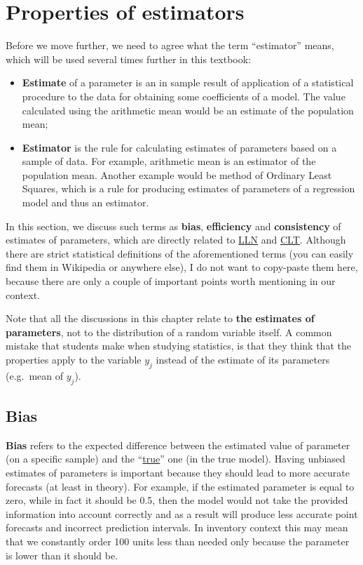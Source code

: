 \documentclass[
]{book}
\providecommand{\tightlist}{%
  \setlength{\itemsep}{0pt}\setlength{\parskip}{0pt}}
\theoremstyle{definition}
\theoremstyle{definition}
\theoremstyle{definition}
\theoremstyle{definition}
\theoremstyle{remark}
\begin{document}
\hypertarget{estimatesProperties}{%
\section{Properties of estimators}\label{estimatesProperties}}

Before we move further, we need to agree what the term ``estimator'' means, which will be used several times further in this textbook:

\begin{itemize}
\tightlist
\item
  \textbf{Estimate} of a parameter is an in sample result of application of a statistical procedure to the data for obtaining some coefficients of a model. The value calculated using the arithmetic mean would be an estimate of the population mean;
\item
  \textbf{Estimator} is the rule for calculating estimates of parameters based on a sample of data. For example, arithmetic mean is an estimator of the population mean. Another example would be method of Ordinary Least Squares, which is a rule for producing estimates of parameters of a regression model and thus an estimator.
\end{itemize}

In this section, we discuss such terms as \textbf{bias}, \textbf{efficiency} and \textbf{consistency} of estimates of parameters, which are directly related to \protect\hyperlink{LLN}{LLN} and \protect\hyperlink{CLT}{CLT}. Although there are strict statistical definitions of the aforementioned terms (you can easily find them in Wikipedia or anywhere else), I do not want to copy-paste them here, because there are only a couple of important points worth mentioning in our context.

Note that all the discussions in this chapter relate to \textbf{the estimates of parameters}, not to the distribution of a random variable itself. A common mistake that students make when studying statistics, is that they think that the properties apply to the variable \(y_j\) instead of the estimate of its parameters (e.g.~mean of \(y_j\)).

\hypertarget{estimatesPropertiesBias}{%
\subsection{Bias}\label{estimatesPropertiesBias}}

\textbf{Bias} refers to the expected difference between the estimated value of parameter (on a specific sample) and the ``\protect\hyperlink{intro}{true}'' one (in the true model). Having unbiased estimates of parameters is important because they should lead to more accurate forecasts (at least in theory). For example, if the estimated parameter is equal to zero, while in fact it should be 0.5, then the model would not take the provided information into account correctly and as a result will produce less accurate point forecasts and incorrect prediction intervals. In inventory context this may mean that we constantly order 100 units less than needed only because the parameter is lower than it should be.
\end{document}
